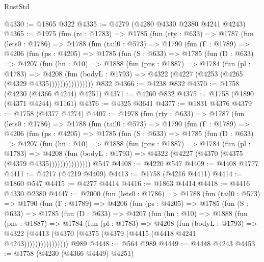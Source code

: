 \begin{lexlean}{RustStd}
\begin{coremodule}
@4330 := @1865 @322
@4335 := @4279 (@4280 @4330 @2380 @4241 @4243)
@4365 := @1975
    (fun (rc : @1783) =>
    @1785
      (fun (rty : @633) =>
      @1787
        (fun (lets0 : @1786) =>
        @1788
          (fun (tail0 : @573) =>
          @1790
            (fun (Γ : @1789) =>
            @4206
              (fun (ps : @4205) =>
              @1785
                (fun (S : @633) =>
                @1785
                  (fun (D : @633) =>
                  @4207
                    (fun (hn : @10) =>
                    @1888
                      (fun (pns : @1887) =>
                      @1784
                        (fun (pl : @1783) =>
                        @4208
                          (fun (bodyL : @1793) =>
                          @4322 (@4227 (@4253 (@4265 (@4329 @4335))))))))))))))))
    @832
@4366 := @4238 @832
@4370 := @1758 (@4230 (@4366 @4244) @4251)
@4371 := @4260 @832
@4375 := @1758 (@1890 (@4371 @4244) @1161)
@4376 := @4325 @3641
@4377 := @1831 @4376
@4379 := @1758 (@4377 @4274)
@4407 := @1978
    (fun (rty : @633) =>
    @1787
      (fun (lets0 : @1786) =>
      @1788
        (fun (tail0 : @573) =>
        @1790
          (fun (Γ : @1789) =>
          @4206
            (fun (ps : @4205) =>
            @1785
              (fun (S : @633) =>
              @1785
                (fun (D : @633) =>
                @4207
                  (fun (hn : @10) =>
                  @1888
                    (fun (pns : @1887) =>
                    @1784
                      (fun (pl : @1783) =>
                      @4208
                        (fun (bodyL : @1793) =>
                        @4322 (@4227 (@4370 (@4375 (@4379 @4335)))))))))))))))
    @547
@4408 := @4220 @547
@4409 := @4408 @1777
@4411 := @4217 (@4219 @4409)
@4413 := @1758 (@4216 @4411)
@4414 := @1860 @547
@4415 := @4277 @4414
@4416 := @1863 @4414
@4418 := @4416 @4330 @2380
@4447 := @2000
    (fun (lets0 : @1786) =>
    @1788
      (fun (tail0 : @573) =>
      @1790
        (fun (Γ : @1789) =>
        @4206
          (fun (ps : @4205) =>
          @1785
            (fun (S : @633) =>
            @1785
              (fun (D : @633) =>
              @4207
                (fun (hn : @10) =>
                @1888
                  (fun (pns : @1887) =>
                  @1784
                    (fun (pl : @1783) =>
                    @4208
                      (fun (bodyL : @1793) =>
                      @4322 (@4413 (@4370 (@4375 (@4379 (@4415 (@4418 @4241 @4243))))))))))))))))
    @989
@4448 := @564 @989
@4449 := @4448 @4243
@4453 := @1758 (@4230 (@4366 @4449) @4251)

\end{coremodule}
\end{lexlean}
